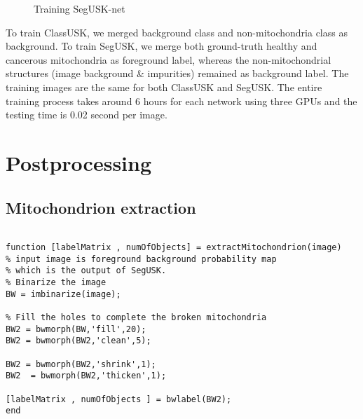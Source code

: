 \begin{figure}[h!]
\centering
{}
	\caption{Training SegUSK-net}
\end{figure}
\vspace{3em}
To train ClassUSK, we merged background class and non-mitochondria class as background. To train SegUSK, we merge both ground-truth healthy and cancerous mitochondria
as foreground label, whereas the non-mitochondrial structures (image background \&
impurities) remained as background label. The training images are the same for both ClassUSK and SegUSK. The entire training process takes around 6 hours for each network using
three GPUs and the testing time is 0.02 second per image.
\section{Postprocessing}
\subsection{Mitochondrion extraction}
\begin{lstlisting}

function [labelMatrix , numOfObjects] = extractMitochondrion(image)
% input image is foreground background probability map
% which is the output of SegUSK.
% Binarize the image
BW = imbinarize(image);

% Fill the holes to complete the broken mitochondria
BW2 = bwmorph(BW,'fill',20);
BW2 = bwmorph(BW2,'clean',5);

BW2 = bwmorph(BW2,'shrink',1);
BW2  = bwmorph(BW2,'thicken',1);

[labelMatrix , numOfObjects ] = bwlabel(BW2);
end
\end{lstlisting}

